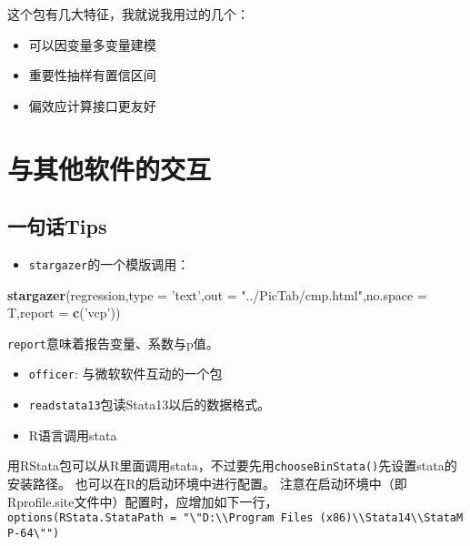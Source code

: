 \documentclass[
]{book}
\newenvironment{Shaded}{\begin{snugshade}}{\end{snugshade}}
\newcommand{\DataTypeTok}[1]{\textcolor[rgb]{0.13,0.29,0.53}{#1}}
\newcommand{\KeywordTok}[1]{\textcolor[rgb]{0.13,0.29,0.53}{\textbf{#1}}}
\newcommand{\NormalTok}[1]{#1}
\newcommand{\StringTok}[1]{\textcolor[rgb]{0.31,0.60,0.02}{#1}}
\providecommand{\tightlist}{%
  \setlength{\itemsep}{0pt}\setlength{\parskip}{0pt}}
\begin{document}
这个包有几大特征，我就说我用过的几个：

\begin{itemize}
\tightlist
\item
  可以因变量多变量建模
\item
  重要性抽样有置信区间
\item
  偏效应计算接口更友好
\end{itemize}

\hypertarget{otherSF}{%
\chapter{与其他软件的交互}\label{otherSF}}

\hypertarget{ux4e00ux53e5ux8bddtips-8}{%
\section{一句话Tips}\label{ux4e00ux53e5ux8bddtips-8}}

\begin{itemize}
\tightlist
\item
  \texttt{stargazer}的一个模版调用：
\end{itemize}

\begin{Shaded}
\begin{Highlighting}[]
\KeywordTok{stargazer}\NormalTok{(regression,}\DataTypeTok{type =} \StringTok{'text'}\NormalTok{,}\DataTypeTok{out =} \StringTok{"../PicTab/cmp.html"}\NormalTok{,}\DataTypeTok{no.space =}\NormalTok{ T,}\DataTypeTok{report =} \KeywordTok{c}\NormalTok{(}\StringTok{'vcp'}\NormalTok{))}
\end{Highlighting}
\end{Shaded}

\texttt{report}意味着报告变量、系数与p值。

\begin{itemize}
\tightlist
\item
  \texttt{officer}: 与微软软件互动的一个包
\item
  \texttt{readstata13}包读Stata13以后的数据格式。
\item
  R语言调用stata
\end{itemize}

用RStata包可以从R里面调用stata，不过要先用\texttt{chooseBinStata()}先设置stata的安装路径。 也可以在R的启动环境中进行配置。
注意在启动环境中（即Rprofile.site文件中）配置时，应增加如下一行，
\texttt{options(RStata.StataPath\ =\ "\textbackslash{}"D:\textbackslash{}\textbackslash{}Program\ Files\ (x86)\textbackslash{}\textbackslash{}Stata14\textbackslash{}\textbackslash{}StataMP-64\textbackslash{}"")}
\end{document}
